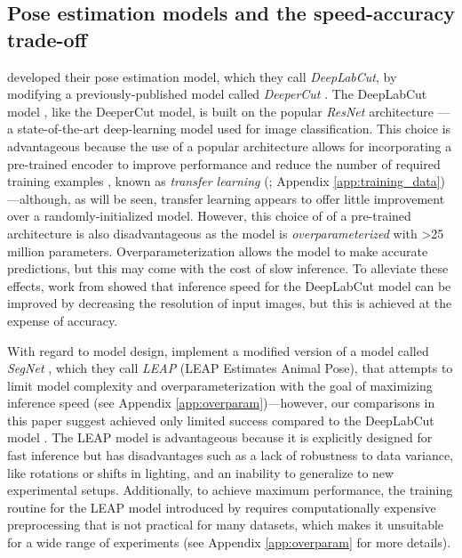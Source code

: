 \documentclass[11pt,a4paper,oneside]{book}
\begin{document}
\begin{doublespace}
\subsection{Pose estimation models and the speed-accuracy trade-off}

\cite{mathis2018deeplabcut} developed their pose estimation model, which they call \textit{DeepLabCut}, by modifying a previously-published model called \textit{DeeperCut} \citep{insafutdinov2016deepercut}. The DeepLabCut model \citep{mathis2018deeplabcut}, like the DeeperCut model, is built on the popular \textit{ResNet} architecture \citep{he2016deep}—a state-of-the-art deep-learning model used for image classification. This choice is advantageous because the use of a popular architecture allows for incorporating a pre-trained encoder to improve performance and reduce the number of required training examples \citep{mathis2018deeplabcut}, known as \textit{transfer learning} (\citealt{pratt1993discriminability}; Appendix \ref{app:training_data})---although, as will be seen, transfer learning appears to offer little improvement over a randomly-initialized model. However, this choice of of a pre-trained architecture is also disadvantageous as the model is \textit{overparameterized} with >25 million parameters. Overparameterization allows the model to make accurate predictions, but this may come with the cost of slow inference. To alleviate these effects, work from \cite{mathis2018inference} showed that inference speed for the DeepLabCut model \citep{mathis2018deeplabcut} can be improved by decreasing the resolution of input images, but this is achieved at the expense of accuracy. 

With regard to model design, \cite{pereira2019fast} implement a modified version of a model called \textit{SegNet} \citep{badrinarayanan2017segnet}, which they call \textit{LEAP} (LEAP Estimates Animal Pose), that attempts to limit model complexity and overparameterization with the goal of maximizing inference speed (see Appendix \ref{app:overparam})—however, our comparisons in this paper suggest \cite{pereira2019fast} achieved only limited success compared to the DeepLabCut model \citep{mathis2018deeplabcut}. The LEAP model is advantageous because it is explicitly designed for fast inference but has disadvantages such as a lack of robustness to data variance, like rotations or shifts in lighting, and an inability to generalize to new experimental setups. Additionally, to achieve maximum performance, the training routine for the LEAP model introduced by \cite{pereira2019fast} requires computationally expensive preprocessing that is not practical for many datasets, which makes it unsuitable for a wide range of experiments (see Appendix \ref{app:overparam} for more details).


\end{doublespace}
\end{document}
